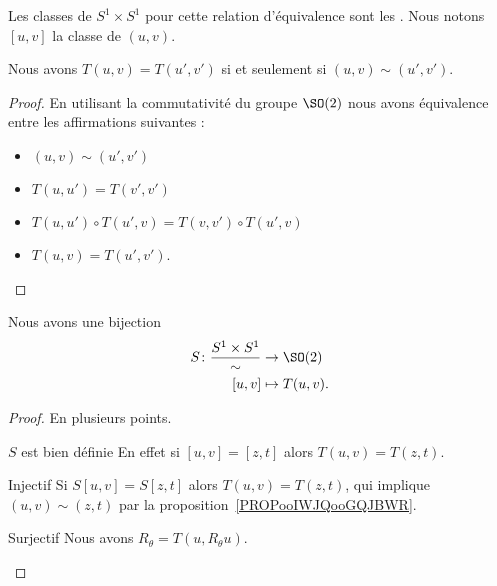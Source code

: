 \begin{definition}      \label{DEFooVBKIooWlHvod}
    Les classes de \( S^1\times S^1\) pour cette relation d'équivalence sont les . Nous notons \( [u,v]\) la classe de \( (u,v)\).
\end{definition}

\begin{proposition}     \label{PROPooIWJQooGQJBWR}
    Nous avons \( T(u,v)=T(u',v')\) si et seulement si \( (u,v)\sim(u',v')\).
\end{proposition}

\begin{proof}
    En utilisant la commutativité du groupe \( \SO(2)\) nous avons équivalence entre les affirmations suivantes :
    \begin{itemize}
        \item \( (u,v)\sim (u',v')\)
        \item \( T(u,u')=T(v',v')\)
        \item \( T(u,u')\circ T(u',v)=T(v,v')\circ T(u',v)\)
        \item
            \( T(u,v)=T(u',v')\).
    \end{itemize}
\end{proof}

\begin{proposition}
    Nous avons une bijection
    \begin{equation}
        \begin{aligned}
            S\colon \frac{ S^1\times S^1 }{ \sim }&\to \SO(2) \\
            [u,v]&\mapsto T(u,v).
        \end{aligned}
    \end{equation}
\end{proposition}

\begin{proof}
    En plusieurs points.
    \begin{subproof}
    \item[\( S\) est bien définie]
        En effet si \( [u,v]=[z,t]\) alors \( T(u,v)=T(z,t)\).
    \item[Injectif]
        Si \( S[u,v]=S[z,t]\) alors \( T(u,v)=T(z,t)\), qui implique \( (u,v)\sim (z,t)\) par la proposition~\ref{PROPooIWJQooGQJBWR}.
    \item[Surjectif]
        Nous avons \( R_{\theta}=T(u,R_{\theta}u)\).
    \end{subproof}
\end{proof}

